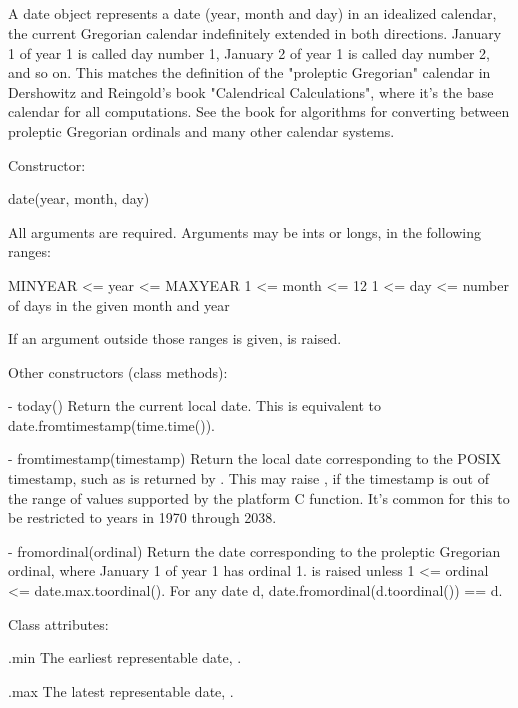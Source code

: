\subsection{ \label{datetime-date}}

A date object represents a date (year, month and day) in an idealized
calendar, the current Gregorian calendar indefinitely extended in both
directions.  January 1 of year 1 is called day number 1, January 2 of year
1 is called day number 2, and so on.  This matches the definition of the
"proleptic Gregorian" calendar in Dershowitz and Reingold's book
"Calendrical Calculations", where it's the base calendar for all
computations.  See the book for algorithms for converting between
proleptic Gregorian ordinals and many other calendar systems.

Constructor:

    date(year, month, day)

    All arguments are required.  Arguments may be ints or longs, in the
    following ranges:

        MINYEAR <= year <= MAXYEAR
        1 <= month <= 12
        1 <= day <= number of days in the given month and year

    If an argument outside those ranges is given,
     is raised.

Other constructors (class methods):

  - today()
    Return the current local date.  This is equivalent to
    date.fromtimestamp(time.time()).

  - fromtimestamp(timestamp)
    Return the local date corresponding to the POSIX timestamp, such
    as is returned by .  This may raise
    , if the timestamp is out of the range of
    values supported by the platform C 
    function.  It's common for this to be restricted to years in 1970
    through 2038.

  - fromordinal(ordinal)
    Return the date corresponding to the proleptic Gregorian ordinal,
    where January 1 of year 1 has ordinal 1.  
    is raised unless 1 <= ordinal <= date.max.toordinal().  For any
    date d, date.fromordinal(d.toordinal()) == d.

Class attributes:

    .min
        The earliest representable date, .

    .max
        The latest representable date, .


